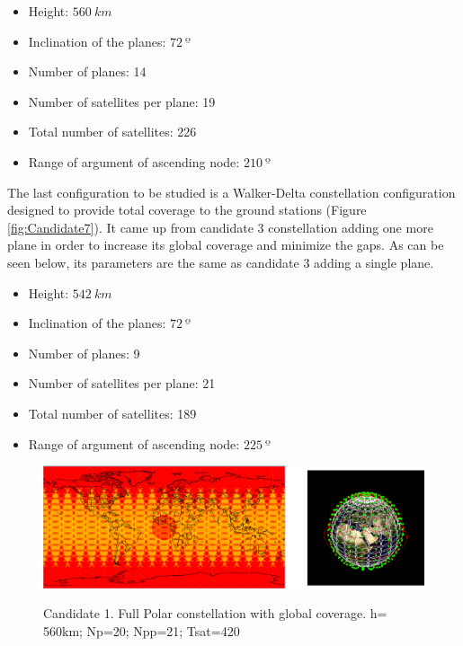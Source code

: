 \begin{itemize}
\item Height: $560~{km}$ 
\item Inclination of the planes: $72~{º}$  
\item Number of planes: 14
\item Number of satellites per plane: 19
\item Total number of satellites: 226
\item Range of argument of ascending node: $210~{º}$
\end{itemize}


The last configuration to be studied is a Walker-Delta constellation configuration designed to provide total coverage to the ground stations (Figure \ref{fig:Candidate7}). It came up from candidate 3 constellation adding one more plane in order to increase its global coverage and minimize the gaps. As can be seen below, its parameters are the same as candidate 3 adding a single plane.

\begin{itemize}
\item Height: $542~{km}$ 
\item Inclination of the planes: $72~{º}$  
\item Number of planes: 9
\item Number of satellites per plane: 21
\item Total number of satellites: 189
\item Range of argument of ascending node: $225~{º}$
\end{itemize}

\begin{figure}%
	\centering
	\includegraphics[width=1\textwidth]{Candidate1.png}\\
	\caption{Candidate 1. Full Polar constellation with global coverage.
			 h= 560km; Np=20; Npp=21; Tsat=420 }
	\label{fig:Candidate1}
\end{figure}

